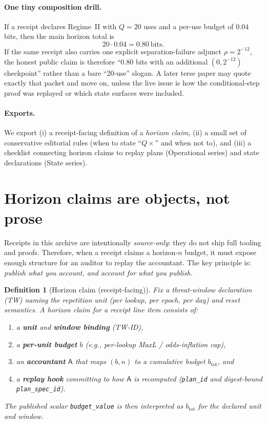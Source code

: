 \documentclass[11pt]{article}
\newtheorem{definition}{Definition}
\begin{document}
\paragraph{One tiny composition drill.}
If a receipt declares Regime~II with $Q=20$ uses and a per-use budget of $0.04$ bits, then the main horizon total is
\[
20\cdot 0.04 = 0.80\ \text{bits}.
\]
If the same receipt also carries one explicit separation-failure adjunct $\rho = 2^{-12}$, the honest public claim is therefore ``$0.80$ bits with an additional $(0,2^{-12})$ checkpoint'' rather than a bare ``20-use'' slogan.
A later terse paper may quote exactly that packet and move on, unless the live issue is how the conditional-step proof was replayed or which state surfaces were included.

\paragraph{Exports.}
We export (i) a receipt-facing definition of a \emph{horizon claim}, (ii) a small set of conservative editorial rules (when to state ``$Q\times$'' and when not to), and (iii) a checklist connecting horizon claims to replay plans (Operational series) and state declarations (State series).

\section{Horizon claims are objects, not prose}
Receipts in this archive are intentionally \emph{source-only}: they do not ship full tooling and proofs.
Therefore, when a receipt claims a horizon-$n$ budget, it must expose enough structure for an auditor to replay the accountant.
The key principle is: \emph{publish what you account, and account for what you publish.}

\begin{definition}[Horizon claim (receipt-facing)]\label{def:horizonclaim}
Fix a threat-window declaration (TW) naming the repetition unit (per lookup, per epoch, per day) and reset semantics.\cite{series:threatwindows}
A \emph{horizon claim} for a receipt line item consists of:
\begin{enumerate}[leftmargin=*]
\item a \textbf{unit} and \textbf{window binding} (TW-ID),
\item a \textbf{per-unit budget} $b$ (e.g., per-lookup MaxL / odds-inflation cap),
\item an \textbf{accountant} $\mathsf{A}$ that maps $(b,n)$ to a cumulative budget $b_{\mathrm{tot}}$, and
\item a \textbf{replay hook} committing to how $\mathsf{A}$ is recomputed (\texttt{plan\_id} and digest-bound \texttt{plan\_spec\_id}).\cite{series:receiptitems,series:planstateequiv}
\end{enumerate}
The published scalar \texttt{budget\_value} is then interpreted as $b_{\mathrm{tot}}$ for the declared unit and window.
\end{definition}
\end{document}
